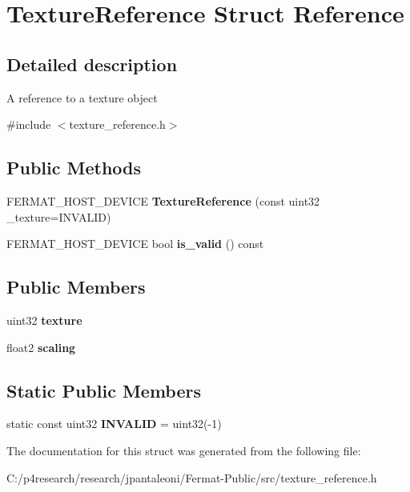 \hypertarget{struct_texture_reference}{}\section{Texture\+Reference Struct Reference}
\label{struct_texture_reference}


\subsection{Detailed description}
A reference to a texture object 

{\ttfamily \#include $<$texture\+\_\+reference.\+h$>$}

\subsection*{Public Methods}
\begin{DoxyCompactItemize}
\item 
\mbox{\label{struct_texture_reference_a35b92917e782ece24240780e4e5aa63a}} 
F\+E\+R\+M\+A\+T\+\_\+\+H\+O\+S\+T\+\_\+\+D\+E\+V\+I\+CE {\bfseries Texture\+Reference} (const uint32 \+\_\+texture=I\+N\+V\+A\+L\+ID)
\item 
\mbox{\label{struct_texture_reference_a27b3a9f7b8a59de01709eeb698adadc4}} 
F\+E\+R\+M\+A\+T\+\_\+\+H\+O\+S\+T\+\_\+\+D\+E\+V\+I\+CE bool {\bfseries is\+\_\+valid} () const
\end{DoxyCompactItemize}
\subsection*{Public Members}
\begin{DoxyCompactItemize}
\item 
\mbox{\label{struct_texture_reference_a93090af58579b14ac074feedc3c80e74}} 
uint32 {\bfseries texture}
\item 
\mbox{\label{struct_texture_reference_ab54047ac9e79efc3dfde29eaa0544cd6}} 
float2 {\bfseries scaling}
\end{DoxyCompactItemize}
\subsection*{Static Public Members}
\begin{DoxyCompactItemize}
\item 
\mbox{\label{struct_texture_reference_ae2280605727e5ecaed9ad438abd9d01a}} 
static const uint32 {\bfseries I\+N\+V\+A\+L\+ID} = uint32(-\/1)
\end{DoxyCompactItemize}


The documentation for this struct was generated from the following file\+:\begin{DoxyCompactItemize}
\item 
C\+:/p4research/research/jpantaleoni/\+Fermat-\/\+Public/src/texture\+\_\+reference.\+h\end{DoxyCompactItemize}
